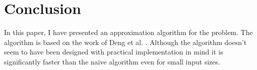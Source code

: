 \section{Conclusion}
In this paper, I have presented an approximation algorithm for the \Partition problem. The algorithm is based on the work of Deng et al. \cite{deng}. Although the algorithm doesn't seem to have been designed with practical implementation in mind it is significantly faster than the naive algorithm even for small input sizes.